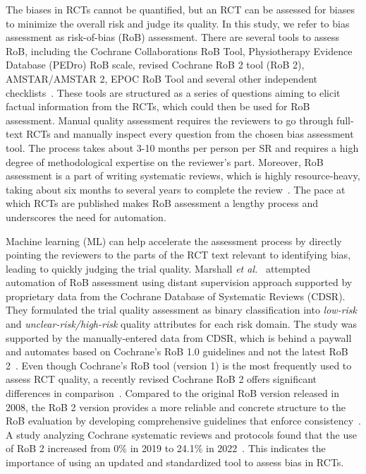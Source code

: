 \documentclass[sn-mathphys,Numbered]{sn-jnl}%
\theoremstyle{thmstyleone}%
\theoremstyle{thmstyletwo}%
\theoremstyle{thmstylethree}%
\begin{document}
The biases in RCTs cannot be quantified, but an RCT can be assessed for biases to minimize the overall risk and judge its quality.
In this study, we refer to bias assessment as risk-of-bias (RoB) assessment.
There are several tools to assess RoB, including the Cochrane Collaborations RoB Tool, Physiotherapy Evidence Database (PEDro) RoB scale, revised Cochrane RoB 2 tool (RoB 2), AMSTAR/AMSTAR 2, EPOC RoB Tool and several other independent checklists~\cite{higgins2019,higgins2011cochrane,elkins2013growth,sterne2019rob,shea2017amstar,farrah2019risk}.
These tools are structured as a series of questions aiming to elicit factual information from the RCTs, which could then be used for RoB assessment.
Manual quality assessment requires the reviewers to go through full-text RCTs and manually inspect every question from the chosen bias assessment tool.
The process takes about 3-10 months per person per SR and requires a high degree of methodological expertise on the reviewer's part.
Moreover, RoB assessment is a part of writing systematic reviews, which is highly resource-heavy, taking about six months to several years to complete the review~\cite{tsertsvadze2015conduct,khangura2012evidence,higgins2019cochrane}.
The pace at which RCTs are published makes RoB assessment a lengthy process and underscores the need for automation.



Machine learning (ML) can help accelerate the assessment process by directly pointing the reviewers to the parts of the RCT text relevant to identifying bias, leading to quickly judging the trial quality.
Marshall \textit{et al.}~\cite{marshall2015automating} attempted automation of RoB assessment using distant supervision approach supported by proprietary data from the Cochrane Database of Systematic Reviews (CDSR). 
They formulated the trial quality assessment as binary classification into \textit{low-risk} and \textit{unclear-risk/high-risk} quality attributes for each risk domain.
The study was supported by the manually-entered data from CDSR, which is behind a paywall and automates based on Cochrane's RoB 1.0 guidelines and not the latest RoB 2~\cite{higgins2011cochrane}.
Even though Cochrane's RoB tool (version 1) is the most frequently used to assess RCT quality, a recently revised Cochrane RoB 2 offers significant differences in comparison~\cite{ma2020methodological}.
Compared to the original RoB version released in 2008, the RoB 2 version provides a more reliable and concrete structure to the RoB evaluation by developing comprehensive guidelines that enforce consistency~\cite{higgins2011cochrane,sterne2019rob}.
A study analyzing Cochrane systematic reviews and protocols found that the use of RoB 2 increased from 0\% in 2019 to 24.1\% in 2022~\cite{martimbianco2023most}.
This indicates the importance of using an updated and standardized tool to assess bias in RCTs.
\end{document}
